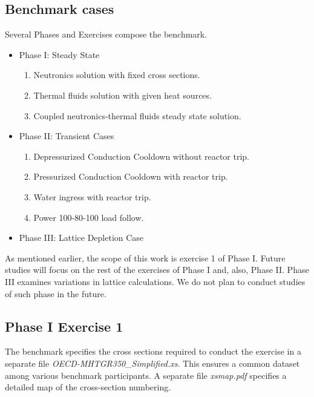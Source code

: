\documentclass{anstrans}
\begin{document}
\subsection{Benchmark cases}

Several Phases and Exercises compose the benchmark.

\begin{itemize}
	\item Phase I: Steady State
        \begin{enumerate}
            \item Neutronics solution with fixed cross sections. 
            \item Thermal fluids solution with given heat sources.
            \item Coupled neutronics-thermal fluids steady state solution.
        \end{enumerate}

        \item Phase II: Transient Cases
        \begin{enumerate}
            \item Depressurized Conduction Cooldown without reactor trip.
            \item Pressurized Conduction Cooldown with reactor trip.
            \item Water ingress with reactor trip.
            \item Power 100-80-100 load follow.
        \end{enumerate}

        \item Phase III: Lattice Depletion Case

\end{itemize}

As mentioned earlier, the scope of this work is exercise 1 of Phase I.
Future studies will focus on the rest of the exercises of Phase I and, also, Phase II.
Phase III examines variations in lattice calculations.
We do not plan to conduct studies of such phase in the future.

\subsection{Phase I Exercise 1} %

The benchmark specifies the cross sections required to conduct the exercise in a separate file \textit{OECD-MHTGR350_Simplified.xs}.
This ensures a common dataset among various benchmark participants.
A separate file \textit{xsmap.pdf} specifies a detailed map of the cross-section numbering.
\end{document}
